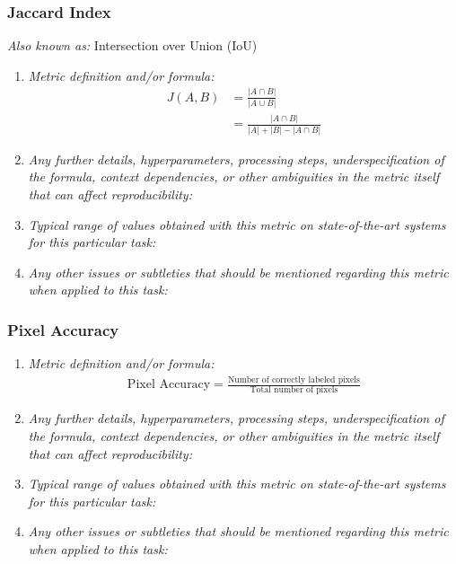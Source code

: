 \documentclass[a4paper,11pt]{article}
\begin{document}
        \subsubsection{Jaccard Index}
            \textit{Also known as:} Intersection over Union (IoU)
            \begin{enumerate}[label=\alph*.]
                \item \textit{Metric definition and/or formula:}
                    \begin{align}
                        J(A,B) &= \frac{\left|A \cap B\right|}{\left|A \cup B\right|}\\
                        &= \frac{\left|A \cap B\right|}{\left|A\right| + \left|B\right| - \left|A \cap B\right|}
                    \end{align}
                \bigskip
                \item \textit{Any further details, hyperparameters, processing steps, underspecification of the formula, context dependencies, or other ambiguities in the metric itself that can affect reproducibility:}
                \bigskip
                \item \textit{Typical range of values obtained with this metric on state-of-the-art systems for this particular task:}
                \bigskip
                \item \textit{Any other issues or subtleties that should be mentioned regarding this metric when applied to this task:}
                \bigskip
            \end{enumerate}
        \subsubsection{Pixel Accuracy}
            \begin{enumerate}[label=\alph*.]
                \item \textit{Metric definition and/or formula:}
                    \begin{align}
                        \textrm{Pixel Accuracy} = \frac{\textrm{Number of correctly labeled pixels}}{\textrm{Total number of pixels}}
                    \end{align}
                \bigskip
                \item \textit{Any further details, hyperparameters, processing steps, underspecification of the formula, context dependencies, or other ambiguities in the metric itself that can affect reproducibility:}
                \bigskip
                \item \textit{Typical range of values obtained with this metric on state-of-the-art systems for this particular task:}
                \bigskip
                \item \textit{Any other issues or subtleties that should be mentioned regarding this metric when applied to this task:}
                \bigskip
            \end{enumerate}
\end{document}
